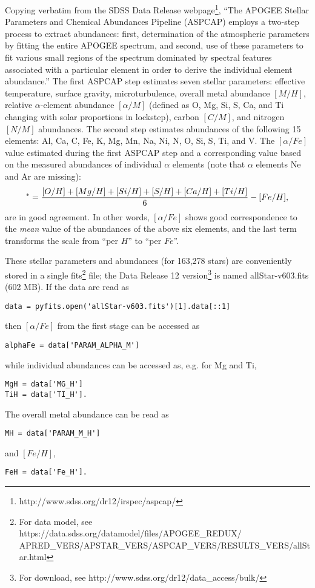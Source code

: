 Copying verbatim from the SDSS Data Release webpage\footnote{http://www.sdss.org/dr12/irspec/aspcap/},
``The APOGEE Stellar Parameters and Chemical Abundances Pipeline (ASPCAP) employs a two-step process 
to extract abundances: first, determination of the atmospheric parameters by fitting the entire APOGEE spectrum, 
and second, use of these parameters to fit various small regions of the spectrum dominated by spectral features
 associated with a particular element in order to derive the individual element abundance.''
The first ASPCAP step estimates seven stellar parameters: effective temperature, surface gravity, microturbulence, 
overall metal abundance $[M/H]$, relative $\alpha$-element abundance $[\alpha/M]$ (defined as O, Mg, Si, S, 
Ca, and Ti changing with solar proportions in lockstep), carbon $[C/M]$, and nitrogen $[N/M]$ abundances.
The second step estimates abundances of the following 15 elements: Al, Ca, C, Fe, K, Mg, Mn, Na, Ni, N, O, Si, S, Ti, and V.
The $[\alpha/Fe]$ value estimated during the first ASPCAP step and a corresponding value based on the
measured abundances of individual $\alpha$ elements (note that $\alpha$ elements Ne and Ar are missing): 
\begin{equation}
       [\alpha/Fe]^\ast= {[O/H]+[Mg/H]+[Si/H]+[S/H]+[Ca/H]+[Ti/H] \over 6} - [Fe/H],
\end{equation}
are in good agreement. In other words, $[\alpha/Fe]$ shows good correspondence to the {\it mean} value 
of the abundances of the above six elements, and the last term transforms the scale from ``per $H$'' to ``per $Fe$''. 

These stellar parameters and abundances (for 163,278 stars) are conveniently stored in a single 
fits\footnote{For data model, see https://data.sdss.org/datamodel/files/APOGEE\_REDUX/ \\
APRED\_VERS/APSTAR\_VERS/ASPCAP\_VERS/RESULTS\_VERS/allStar.html}
file; the Data Release 12 version\footnote{For download, see http://www.sdss.org/dr12/data\_access/bulk/} 
is named allStar-v603.fits (602 MB). If the data are read as 
\begin{verbatim}
data = pyfits.open('allStar-v603.fits')[1].data[::1] 
\end{verbatim}
then $[\alpha/Fe]$ from the first stage can be accessed as 
\begin{verbatim}
alphaFe = data['PARAM_ALPHA_M']
\end{verbatim}
while individual abundances can be accessed as, e.g. for Mg and Ti,
\begin{verbatim}
MgH = data['MG_H']
TiH = data['TI_H'].
\end{verbatim}
The overall metal abundance can be read as 
\begin{verbatim}
MH = data['PARAM_M_H']
\end{verbatim}
and $[Fe/H]$, 
\begin{verbatim}
FeH = data['Fe_H'].
\end{verbatim}

